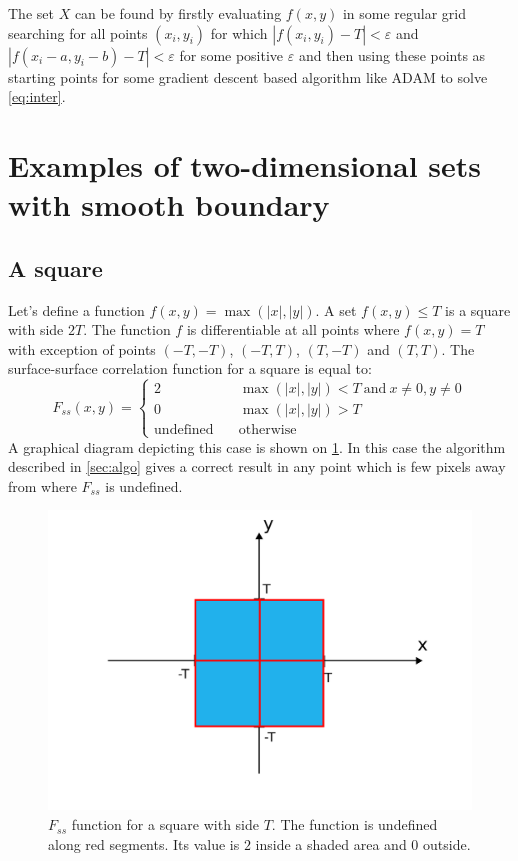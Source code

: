 \documentclass[reprint,amsmath,amssymb,aps,pre,showkeys,showpacs]{revtex4-1}
\begin{document}
The set $X$ can be found by firstly evaluating $f(x, y)$ in some regular grid
searching for all points $(x_i, y_i)$ for which $|f(x_i, y_i) - T| < \varepsilon$ 
and $|f(x_i - a, y_i - b) - T| < \varepsilon$ for some positive $\varepsilon$
and then using these points as starting points for some gradient descent based
algorithm like ADAM to solve \cref{eq:inter}.

\section{Examples of two-dimensional sets with smooth boundary}
\label{seq:examples}
\subsection{A square}
Let's define a function $f(x, y) = \max(|x|, |y|)$. A set $f(x, y) \le T$ is a
square with side $2T$. The function $f$ is differentiable at all points where
$f(x, y) = T$ with exception of points $(-T, -T)$, $(-T, T)$, $(T, -T)$ and
$(T, T)$. The surface-surface correlation function for a square is equal to:
\begin{equation*}
  F_{ss}(x, y) = \left\{
  \begin{array}{ll}
    2 & \quad \max(|x|, |y|) < T \ \text{and}\ x\ne0, y\ne0 \\
    0 & \quad \max(|x|, |y|) > T \\
    \text{undefined} & \quad \text{otherwise}
  \end{array}
  \right.
\end{equation*}
A graphical diagram depicting this case is shown on \cref{fig:fss-square}. In
this case the algorithm described in \cref{sec:algo} gives a correct result in
any point which is few pixels away from where $F_{ss}$ is undefined.
\begin{figure}
  \centering
  \includegraphics[width=\linewidth]{images/fss-square.png}
  \caption[]{$F_{ss}$ function for a square with side $T$. The function is
    undefined along red segments. Its value is $2$ inside a shaded area and $0$
    outside.}
  \label{fig:fss-square}
\end{figure}
\end{document}

